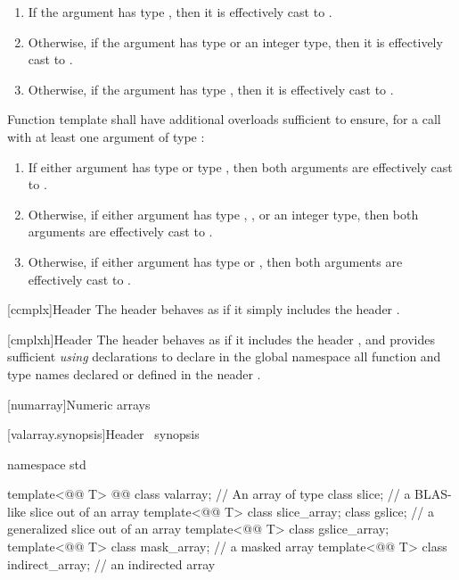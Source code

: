 \documentclass[american,twoside]{book}
\begin{document}
\begin{paras}
\begin{enumerate}
        \item{If the argument has type , then it is effectively 
              cast to .}
        \item{Otherwise, if the argument has type  or an integer type,
              then it is effectively cast to .}
        \item{Otherwise, if the argument has type , then it is 
              effectively cast to .}
\end{enumerate}

\pnum
{}%
Function template  shall have additional overloads sufficient to
ensure, for a call with at least one argument of type :

\begin{enumerate}

  \item{If either argument has type  or type , then both arguments are effectively cast to
        .}
  \item{Otherwise, if either argument has type , ,
        or an integer type, then both arguments are effectively cast to
        .}
  \item{Otherwise, if either argument has type  or ,
        then both arguments are effectively cast to .}
\end{enumerate}

[ccmplx]{\marktr{}Header }
\pnum
{}%
The header behaves as if it simply includes the header .

[cmplxh]{\marktr{}Header }
\pnum
{}%
The header behaves as if it includes the header , and provides
sufficient \textit{using} declarations to declare in the global namespace all
function and type names declared or defined in the neader .

\setcounter{section}{4}
[numarray]{Numeric arrays}

[valarray.synopsis]{Header \ synopsis}
%
\begin{codeblock}
namespace std {
  template<@@ T> @@
    class valarray;         // An array of type 
  class slice;                              // a BLAS-like slice out of an array
  template<@@ T> class slice_array;
  class gslice;                             // a generalized slice out of an array
  template<@@ T> class gslice_array;
  template<@@ T> class mask_array;       // a masked array
  template<@@ T> class indirect_array;   // an indirected array

}
\end{codeblock}
\end{paras}
\end{document}
